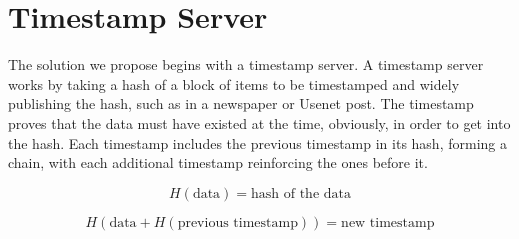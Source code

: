 \documentclass{article}
\begin{document}
\section{Timestamp Server}

The solution we propose begins with a timestamp server. A timestamp server works by taking a hash of a block of items to be timestamped and widely publishing the hash, such as in a newspaper or Usenet post. The timestamp proves that the data must have existed at the time, obviously, in order to get into the hash. Each timestamp includes the previous timestamp in its hash, forming a chain, with each additional timestamp reinforcing the ones before it.

\begin{equation}
    H(\text{data}) = \text{hash of the data}
\end{equation}

\begin{equation}
    H(\text{data} + H(\text{previous timestamp})) = \text{new timestamp}
\end{equation}
\end{document}
